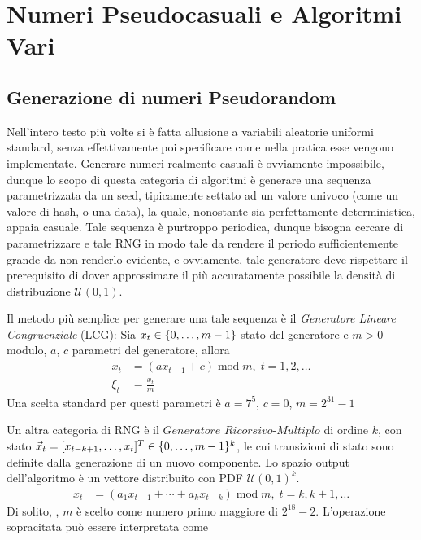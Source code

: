 \chapter{Numeri Pseudocasuali e Algoritmi Vari}\label{appendixC}
\section{Generazione di numeri Pseudorandom}\label{appendixC:RNG}
Nell'intero testo pi\`u volte si \`e fatta allusione a variabili aleatorie uniformi standard, senza effettivamente poi specificare come nella 
pratica esse vengono implementate. Generare numeri realmente casuali \`e ovviamente impossibile, dunque lo scopo di questa categoria di algoritmi 
\`e generare una sequenza parametrizzata da un seed, tipicamente settato ad un valore univoco (come un valore di hash, o una data), la quale,
nonostante sia perfettamente deterministica, appaia casuale. Tale sequenza \`e purtroppo periodica, dunque bisogna cercare di parametrizzare e 
tale RNG in modo tale da rendere il periodo sufficientemente grande da non renderlo evidente, e ovviamente, tale generatore deve rispettare 
il prerequisito di dover approssimare il pi\`u accuratamente possibile la densit\`a di distribuzione $\mathcal{U}(0,1)$.\par
Il metodo pi\`u semplice per generare una tale sequenza \`e il \textit{Generatore Lineare Congruenziale} (LCG): 
Sia $\mathmakebox{x_t}\in\{0,\ldots,m-1\}$
stato del generatore e $m>0$ modulo, $a$, $c$ parametri del generatore, allora
\begin{align}
	x_t&=(ax_{t-1}+c)\operatorname{mod}m,\;t=1,2,\ldots\\
	\xi_t&=\frac{x_t}{m}\nonumber
\end{align}
Una scelta standard per questi parametri \cite{dirk} \`e $a=7^5$, $c=0$, $m=2^{31}-1$\par
Un altra categoria di RNG \`e il $\textit{Generatore Ricorsivo-Multiplo}$ di ordine\footnotemark{} $k$, con stato 
$\mathmakebox{\vec{x}_t=[x_{t-k+1},\ldots,x_t]^T\in\{0,\ldots,m-1\}^k}$, le cui transizioni di stato sono definite dalla generazione di un nuovo 
componente. Lo spazio output dell'algoritmo \`e un vettore distribuito con PDF $\mathcal{U}(0,1)^k$.
\begin{align}
	x_t&=(a_1x_{t-1}+\cdots+a_kx_{t-k})\operatorname{mod}m,\;t=k,k+1,\ldots
\end{align}
Di solito, \cite{dirk}, $m$ \`e scelto come numero primo maggiore di $2^{18}-2$. L'operazione sopracitata pu\`o essere interpretata come 
